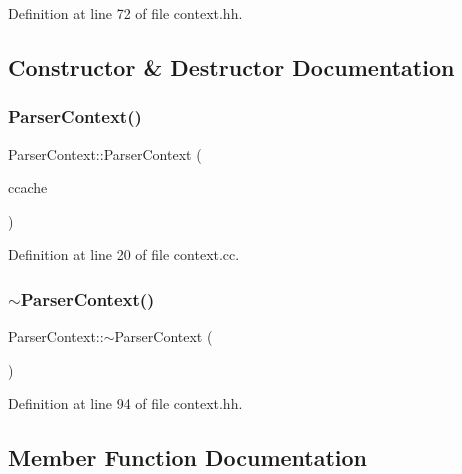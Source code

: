 Definition at line 72 of file context.\+hh.



\subsection{Constructor \& Destructor Documentation}
\mbox{\label{class_parser_context_a1f9d9209341ee399159bef431641eb08}} 
\subsubsection{\texorpdfstring{ParserContext()}{ParserContext()}}
{\footnotesize\ttfamily Parser\+Context\+::\+Parser\+Context (\begin{DoxyParamCaption}\item[{\mbox{\hyperlink{class_context_cache}{Context\+Cache}} $\ast$}]{ccache }\end{DoxyParamCaption})}



Definition at line 20 of file context.\+cc.

\mbox{\label{class_parser_context_a8a561cf95869f260c22591de7035914e}} 
\subsubsection{\texorpdfstring{$\sim$ParserContext()}{~ParserContext()}}
{\footnotesize\ttfamily Parser\+Context\+::$\sim$\+Parser\+Context (\begin{DoxyParamCaption}\item[{void}]{ }\end{DoxyParamCaption})\hspace{0.3cm}{\ttfamily [inline]}}



Definition at line 94 of file context.\+hh.



\subsection{Member Function Documentation}
\mbox{\label{class_parser_context_a26c3fe0af432d556742152f7049dfcb9}} 
